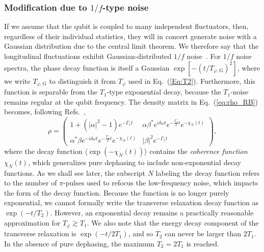 \documentclass[aip,apr,twocolumn,showpacs,superscriptaddress,groupedaddress,nofootinbib,reprint]{revtex4-1}  %
\begin{document}
\subsubsection{Modification due to $1/f$-type noise}
\label{sec:mod_1_f_noise}
If we assume that the qubit is coupled to many independent fluctuators, then, regardless of their individual statistics, they will in concert generate noise with a Gaussian distribution due to the central limit theorem. We therefore say that the longitudinal fluctuations exhibit Gaussian-distributed $1/f$ noise~\cite{Falci2005,Paladino2014}. For $1/f$ noise spectra, the phase decay function is itself a Gaussian $\exp \left[ -(t/T_{\varphi,\mathrm{G}})^2 \right]$, where we write $T_{\varphi,\mathrm{G}}$ to distinguish it from $T_{\varphi}$ used in Eq.~(\ref{Eq:T2}). Furthermore, this function is separable from the $T_1$-type exponential decay, because the $T_1$-noise remains regular at the qubit frequency. The density matrix in Eq.~(\ref{eq:rho_RB}) becomes, following Refs.~,
%
\begin{equation}
\label{eq:rho_1_f}
    \rho %
    = \left(
        \begin{matrix}
            1 + (|\alpha|^2-1) e^{- \Gamma_1 t} & \alpha \beta^* e^{i \delta \omega t} e^{- \frac{\Gamma_1}{2} t} e^{- \chi_N (t)}  \\
            \alpha^* \beta e^{-i \delta \omega t} e^{- \frac{\Gamma_1}{2} t} e^{-\chi_N (t)}  & |\beta|^2 e^{- \Gamma_1 t}
        \end{matrix}
        \right),
\end{equation}
%
where the decay function $\langle \exp(- \chi_N(t)) \rangle$ contains the \textit{coherence function} $\chi_N(t)$, which generalizes pure dephasing to include non-exponential decay functions. As we shall see later, the subscript $N$ labeling the decay function
refers to the number of $\pi$-pulses used to refocus the low-frequency noise, which impacts the form of the decay function. Because the function is no longer purely exponential, we cannot formally write the transverse relaxation decay function as $\exp(-t/T_2)$. However, an exponential decay remains a practically reasonable approximation for $T_{\varphi} \gtrsim T_1$. We also note that the energy decay component of the transverse relaxation is $\exp(-t/2T_1)$, and so $T_2$ can never be larger than $2T_1$. In the absence of pure dephasing, the maximum $T_2=2T_1$ is reached.
\end{document}

